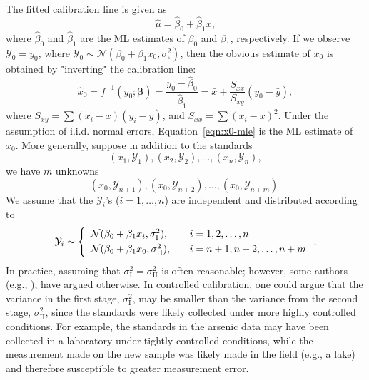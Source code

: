 \documentclass[cmfont,usenames,dvipsnames,leqno]{afit-etd}\usepackage[]{graphicx}\usepackage[]{color}
\newcommand{\mc}[1]{\ensuremath{\mathcal{#1}}}
\newcommand{\wh}[1]{\ensuremath{\widehat{#1}}}
\begin{document}
The fitted calibration line is given as
\begin{equation}
\label{eqn:fitted-slr-model}
  \wh{\mu} = \wh{\beta}_0 + \wh{\beta}_1 x,
\end{equation}
where $\wh{\beta}_0$ and $\wh{\beta}_1$ are the ML estimates of $\beta_0$ and $\beta_1$, respectively. If we observe $\mc{Y}_0 = y_0$, where $\mc{Y}_0 \sim \mc{N}(\beta_0 + \beta_1 x_0, \sigma_\epsilon^2)$, then the obvious estimate of $x_0$ is obtained by "inverting" the calibration line:
\begin{equation}
\label{eqn:x0-mle}
  \wh{x}_0 = {f}^{-1}(y_0; \bm{\beta}) = \frac{y_0 - \wh{\beta}_0}{\wh{\beta}_1} = \bar{x} + \frac{S_{xx}}{S_{xy}}(y_0 - \bar{y}),
\end{equation}
where $S_{xy} = \sum(x_i-\bar{x})(y_i-\bar{y})$, and $S_{xx} = \sum(x_i-\bar{x})^2$. Under the assumption of i.i.d. normal errors, Equation~\eqref{eqn:x0-mle} is the ML estimate of $x_0$. More generally, suppose in addition to the standards 
\begin{equation*}
  (x_1, \mc{Y}_1), (x_2, \mc{Y}_2), \dotsc, (x_n, \mc{Y}_n),
\end{equation*}
we have $m$ unknowns
\begin{equation*}
  (x_0, \mc{Y}_{n+1}), (x_0, \mc{Y}_{n+2}), \dotsc, (x_0, \mc{Y}_{n+m}).
\end{equation*}
We assume that the $\mc{Y}_i$'s ($i = 1, \dotsc, n$) are independent and distributed according to
\begin{equation*}
  \mc{Y}_i \sim \left\{
  \begin{array}{l l}
    \mc{N}(\beta_0+\beta_1 x_i, \sigma_{\text{I}}^2), & \quad i=1,2,\dotsc,n \smallskip \\
    \mc{N}(\beta_0+\beta_1 x_0, \sigma_{\text{II}}^2), & \quad i=n+1,n+2,\dotsc,n+m
  \end{array} \right..
\end{equation*}
In practice, assuming that $\sigma_{\text{I}}^2 = \sigma_{\text{II}}^2$ is often reasonable; however, some authors (e.g., \citet[p. 659]{berkson_estimation_1969}), have argued otherwise. In controlled calibration, one could argue that the variance in the first stage, $\sigma_{\text{I}}^2$, may be smaller than the variance from the second stage, $\sigma_{\text{II}}^2$, since the standards were likely collected under more highly controlled conditions. For example, the standards in the arsenic data may have been collected in a laboratory under tightly controlled conditions, while the measurement made on the new sample was likely made in the field (e.g., a lake) and therefore susceptible to greater measurement error. 
\end{document}
